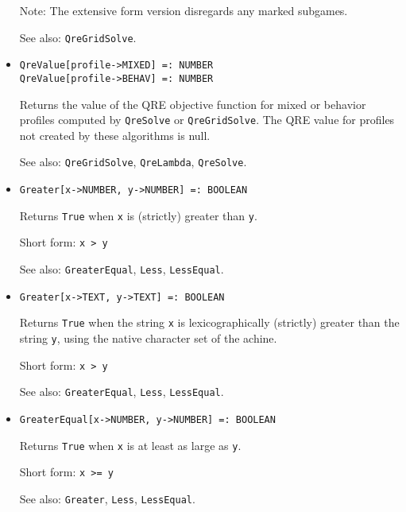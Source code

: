 \begin{itemize}
\item
[Note:] The extensive form version disregards any marked
subgames.
\item [See also:] \verb+QreGridSolve+.
\ed

\item{}
\protect \large \begin{verbatim}
QreValue[profile->MIXED] =: NUMBER 
QreValue[profile->BEHAV] =: NUMBER 
\end{verbatim}\normalsize

\bd
Returns the value of the QRE objective function for mixed or behavior
profiles computed by \verb+QreSolve+ or \verb+QreGridSolve+.  The QRE
value for profiles not created by these algorithms is null.
\item
[See also:] \verb+QreGridSolve+, \verb+QreLambda+, \verb+QreSolve+.
\ed

\item{}
\protect \large \begin{verbatim}
Greater[x->NUMBER, y->NUMBER] =: BOOLEAN 
\end{verbatim}\normalsize

\bd
Returns \verb+True+ when \verb+x+ is (strictly) greater than \verb+y+.
\item
[Short form:] \verb+x > y+
\item
[See also:] \verb+GreaterEqual+, \verb+Less+, \verb+LessEqual+.
\ed

\item{}
\protect \large \begin{verbatim}
Greater[x->TEXT, y->TEXT] =: BOOLEAN 
\end{verbatim}\normalsize

\bd
Returns \verb+True+ when the string \verb+x+ is lexicographically (strictly)
greater than the string \verb+y+, using the native character set of the 
achine.
\item
[Short form:] \verb+x > y+
\item
[See also:] \verb+GreaterEqual+, \verb+Less+, \verb+LessEqual+.
\ed

\item{}
\protect \large \begin{verbatim}
GreaterEqual[x->NUMBER, y->NUMBER] =: BOOLEAN 
\end{verbatim}\normalsize

\bd
Returns \verb+True+ when \verb+x+ is at least as large as \verb+y+.
\item
[Short form:] \verb+x >= y+
\item
[See also:] \verb+Greater+, \verb+Less+, \verb+LessEqual+.
\ed


\end{itemize}
